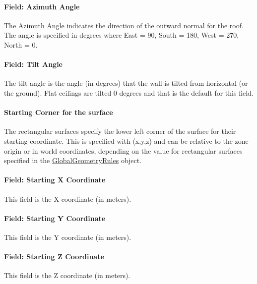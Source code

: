 \paragraph{Field: Azimuth Angle}\label{field-azimuth-angle-5}

The Azimuth Angle indicates the direction of the outward normal for the roof. The angle is specified in degrees where East = 90, South = 180, West = 270, North = 0.

\paragraph{Field: Tilt Angle}\label{field-tilt-angle-5}

The tilt angle is the angle (in degrees) that the wall is tilted from horizontal (or the ground). Flat ceilings are tilted 0 degrees and that is the default for this field.

\paragraph{Starting Corner for the surface}\label{starting-corner-for-the-surface-5}

The rectangular surfaces specify the lower left corner of the surface for their starting coordinate. This is specified with (x,y,z) and can be relative to the zone origin or in world coordinates, depending on the value for rectangular surfaces specified in the \hyperref[globalgeometryrules]{GlobalGeometryRules} object.

\paragraph{Field: Starting X Coordinate}\label{field-starting-x-coordinate-5}

This field is the X coordinate (in meters).

\paragraph{Field: Starting Y Coordinate}\label{field-starting-y-coordinate-5}

This field is the Y coordinate (in meters).

\paragraph{Field: Starting Z Coordinate}\label{field-starting-z-coordinate-5}

This field is the Z coordinate (in meters).

